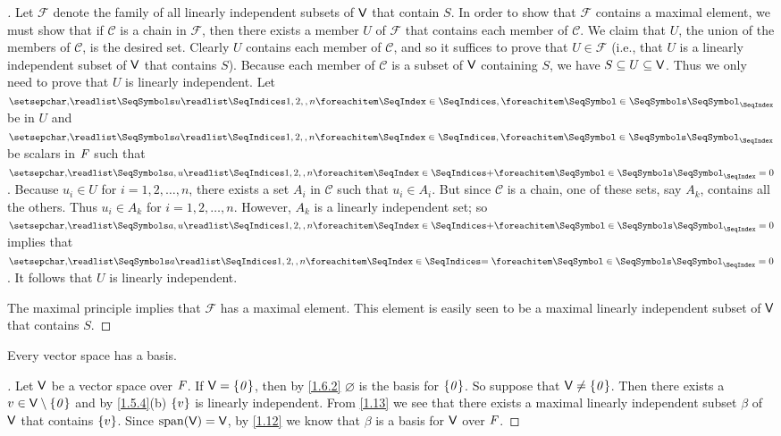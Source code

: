 \begin{proof}[]
	Let \(\mathcal{F}\) denote the family of all linearly independent subsets of \(\mathsf{V}\) that contain \(S\).
	In order to show that \(\mathcal{F}\) contains a maximal element, we must show that if \(\mathcal{C}\) is a chain in \(\mathcal{F}\), then there exists a member \(U\) of \(\mathcal{F}\) that contains each member of \(\mathcal{C}\).
	We claim that \(U\), the union of the members of \(\mathcal{C}\), is the desired set.
	Clearly \(U\) contains each member of \(\mathcal{C}\), and so it suffices to prove that \(U \in \mathcal{F}\)
	(i.e., that \(U\) is a linearly independent subset of \(\mathsf{V}\) that contains \(S\)).
	Because each member of \(\mathcal{C}\) is a subset of \(\mathsf{V}\) containing \(S\), we have \(S \subseteq U \subseteq \mathsf{V}\).
	Thus we only need to prove that \(U\) is linearly independent.
	Let \(\seq{u}{1,2,,n}\) be in \(U\) and \(\seq{a}{1,2,,n}\) be scalars in \(\mathit{F}\) such that \(\seq[+]{a,u}{1,2,,n} = 0\).
	Because \(u_i \in U\) for \(i = 1, 2, \dots, n\), there exists a set \(A_i\) in \(\mathcal{C}\) such that \(u_i \in A_i\).
	But since \(\mathcal{C}\) is a chain, one of these sets, say \(A_k\), contains all the others.
	Thus \(u_i \in A_k\) for \(i = 1, 2, \dots, n\).
	However, \(A_k\) is a linearly independent set;
	so \(\seq[+]{a,u}{1,2,,n} = 0\) implies that \(\seq[=]{a}{1,2,,n} = 0\).
	It follows that \(U\) is linearly independent.

	The maximal principle implies that \(\mathcal{F}\) has a maximal element.
	This element is easily seen to be a maximal linearly independent subset of \(\mathsf{V}\) that contains \(S\).
\end{proof}

\begin{cor}\label{1.7.10}
	Every vector space has a basis.
\end{cor}

\begin{proof}[]
	Let \(\mathsf{V}\) be a vector space over \(\mathit{F}\).
	If \(\mathsf{V} = \left\lbrace\mathit{0}\right\rbrace\), then by \cref{1.6.2} \(\varnothing\) is the basis for \(\left\lbrace\mathit{0}\right\rbrace\).
	So suppose that \(\mathsf{V} \neq \left\lbrace\mathit{0}\right\rbrace\).
	Then there exists a \(v \in \mathsf{V} \setminus \left\lbrace\mathit{0}\right\rbrace\) and by \cref{1.5.4}(b) \(\left\lbrace v\right\rbrace\) is linearly independent.
	From \cref{1.13} we see that there exists a maximal linearly independent subset \(\beta\) of \(\mathsf{V}\) that contains \(\left\lbrace v\right\rbrace\).
	Since \(\spn{\V} = \V\), by \cref{1.12} we know that \(\beta\) is a basis for \(\mathsf{V}\) over \(\mathit{F}\).
\end{proof}

